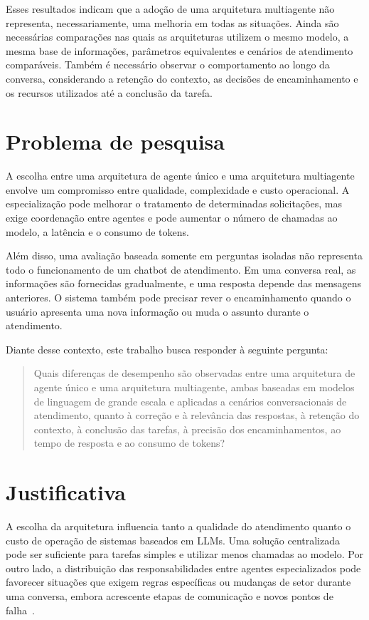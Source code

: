 Esses resultados indicam que a adoção de uma arquitetura multiagente não representa, necessariamente, uma melhoria em todas as situações. Ainda são necessárias comparações nas quais as arquiteturas utilizem o mesmo modelo, a mesma base de informações, parâmetros equivalentes e cenários de atendimento comparáveis. Também é necessário observar o comportamento ao longo da conversa, considerando a retenção do contexto, as decisões de encaminhamento e os recursos utilizados até a conclusão da tarefa.

\section{Problema de pesquisa}\label{sec:problema}

A escolha entre uma arquitetura de agente único e uma arquitetura multiagente envolve um compromisso entre qualidade, complexidade e custo operacional. A especialização pode melhorar o tratamento de determinadas solicitações, mas exige coordenação entre agentes e pode aumentar o número de chamadas ao modelo, a latência e o consumo de tokens.

Além disso, uma avaliação baseada somente em perguntas isoladas não representa todo o funcionamento de um chatbot de atendimento. Em uma conversa real, as informações são fornecidas gradualmente, e uma resposta depende das mensagens anteriores. O sistema também pode precisar rever o encaminhamento quando o usuário apresenta uma nova informação ou muda o assunto durante o atendimento.

Diante desse contexto, este trabalho busca responder à seguinte pergunta:

\begin{quote}
Quais diferenças de desempenho são observadas entre uma arquitetura de agente único e uma arquitetura multiagente, ambas baseadas em modelos de linguagem de grande escala e aplicadas a cenários conversacionais de atendimento, quanto à correção e à relevância das respostas, à retenção do contexto, à conclusão das tarefas, à precisão dos encaminhamentos, ao tempo de resposta e ao consumo de tokens?
\end{quote}

\section{Justificativa}\label{sec:justificativa}

A escolha da arquitetura influencia tanto a qualidade do atendimento quanto o custo de operação de sistemas baseados em LLMs. Uma solução centralizada pode ser suficiente para tarefas simples e utilizar menos chamadas ao modelo. Por outro lado, a distribuição das responsabilidades entre agentes especializados pode favorecer situações que exigem regras específicas ou mudanças de setor durante uma conversa, embora acrescente etapas de comunicação e novos pontos de falha~\cite{yan2026}.

